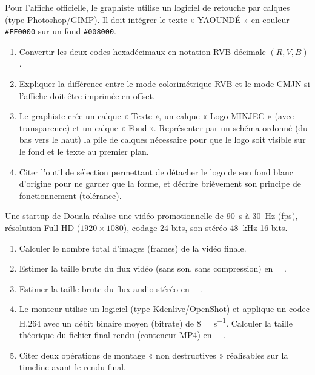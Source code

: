 \documentclass[11pt]{article}
\begin{document}
\begin{exercice}
Pour l'affiche officielle, le graphiste utilise un logiciel de retouche par calques (type Photoshop/GIMP). Il doit intégrer le texte « YAOUNDÉ » en couleur \texttt{\#FF0000} sur un fond \texttt{\#008000}.
\begin{enumerate}
    \item Convertir les deux codes hexadécimaux en notation RVB décimale $(R, V, B)$.
    \item Expliquer la différence entre le mode colorimétrique RVB et le mode CMJN si l'affiche doit être imprimée en offset.
    \item Le graphiste crée un calque « Texte », un calque « Logo MINJEC » (avec transparence) et un calque « Fond ». Représenter par un schéma ordonné (du bas vers le haut) la pile de calques nécessaire pour que le logo soit visible sur le fond et le texte au premier plan.
    \item Citer l'outil de sélection permettant de détacher le logo de son fond blanc d'origine pour ne garder que la forme, et décrire brièvement son principe de fonctionnement (tolérance).
\end{enumerate}
\end{exercice}

\begin{exercice}
Une startup de Douala réalise une vidéo promotionnelle de \SI{90}{\second} à \SI{30}{\hertz} (fps), résolution Full HD ($1920 \times 1080$), codage 24 bits, son stéréo \SI{48}{\kilo\hertz} 16 bits.
\DeclareSIUnit{}
\begin{enumerate}
    \item Calculer le nombre total d'images (frames) de la vidéo finale.
    \item Estimer la taille brute du flux vidéo (sans son, sans compression) en \SI{}{\giga\octet}.
    \item Estimer la taille brute du flux audio stéréo en \SI{}{\mega\octet}.
    \item Le monteur utilise un logiciel (type Kdenlive/OpenShot) et applique un codec H.264 avec un débit binaire moyen (bitrate) de \SI{8}{\mega\bit\per\second}. Calculer la taille théorique du fichier final rendu (conteneur MP4) en \SI{}{\mega\octet}.
    \item Citer deux opérations de montage « non destructives » réalisables sur la timeline avant le rendu final.
\end{enumerate}
\end{exercice}
\end{document}
